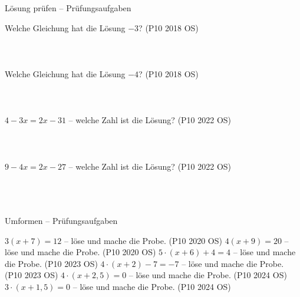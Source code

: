 \setcounter{aufgabe}{24}

\begin{aufgabe}{Lösung prüfen – Prüfungsaufgaben}
\begin{teile}
\teil Welche Gleichung hat die Lösung $-3$? \hfill (P10 2018 OS) \\  \\  \\  \\ 
\teil Welche Gleichung hat die Lösung $-4$? \hfill (P10 2018 OS) \\  \\  \\  \\ 
\teil $4 - 3x = 2x - 31$ – welche Zahl ist die Lösung? \hfill (P10 2022 OS) \\  \\  \\  \\ 
\teil $9 - 4x = 2x - 27$ – welche Zahl ist die Lösung? \hfill (P10 2022 OS) \\  \\  \\  \\ 
\end{teile}
\end{aufgabe}

\begin{aufgabe}{Umformen – Prüfungsaufgaben}
\begin{teile}
\teil $3(x + 7) = 12$ – löse und mache die Probe. \hfill (P10 2020 OS)
\teil $4(x + 9) = 20$ – löse und mache die Probe. \hfill (P10 2020 OS)
\teil $5 \cdot (x + 6) + 4 = 4$ – löse und mache die Probe. \hfill (P10 2023 OS)
\teil $4 \cdot (x + 2) - 7 = -7$ – löse und mache die Probe. \hfill (P10 2023 OS)
\teil $4 \cdot (x + 2{,}5) = 0$ – löse und mache die Probe. \hfill (P10 2024 OS)
\teil $3 \cdot (x + 1{,}5) = 0$ – löse und mache die Probe. \hfill (P10 2024 OS)
\end{teile}
\end{aufgabe}

